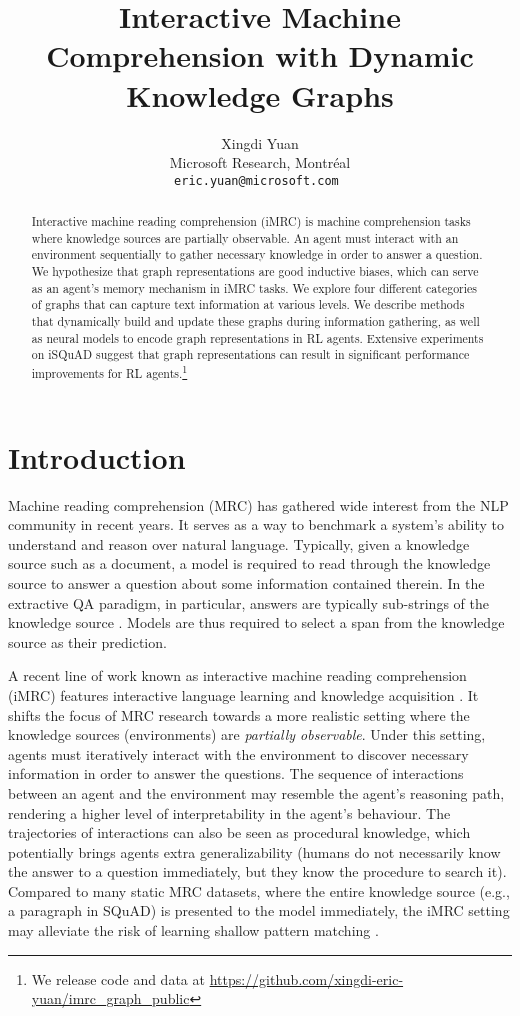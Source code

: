 \documentclass[11pt]{article}
\title{Interactive Machine Comprehension with Dynamic Knowledge Graphs}
\author{Xingdi Yuan\\
Microsoft Research, Montr\'{e}al \\
{\tt eric.yuan@microsoft.com }
}
\newcommand{\isquad}{iSQuAD\xspace}
\newcommand{\imrc}{iMRC\xspace}
\newcommand{\squad}{SQuAD\xspace}
\begin{document}
\maketitle
\begin{abstract}
Interactive machine reading comprehension (\imrc) is machine comprehension tasks where knowledge sources are partially observable. 
An agent must interact with an environment sequentially to gather necessary knowledge in order to answer a question.
We hypothesize that graph representations are good inductive biases, which can serve as an agent's memory mechanism in \imrc tasks.
We explore four different categories of graphs that can capture text information at various levels.
We describe methods that dynamically build and update these graphs during information gathering, as well as neural models to encode graph representations in RL agents.
Extensive experiments on \isquad suggest that graph representations can result in significant performance improvements for RL agents.\footnote{We release code and data at \url{https://github.com/xingdi-eric-yuan/imrc_graph_public}}

\end{abstract}

\section{Introduction}
\label{section:intro}

Machine reading comprehension (MRC) has gathered wide interest from the NLP community in recent years.
It serves as a way to benchmark a system's ability to understand and reason over natural language.
Typically, given a knowledge source such as a document, a model is required to read through the knowledge source to answer a question about some information contained therein.
In the extractive QA paradigm, in particular, answers are typically sub-strings of the knowledge source \citep{rajpurkar16squad,trischler16newsqa,yang18hotpot}.
Models are thus required to select a span from the knowledge source as their prediction.

A recent line of work known as interactive machine reading comprehension (\imrc) features interactive language learning and knowledge acquisition \citep{yuan2020imrc,ferguson2020iirc}.
It shifts the focus of MRC research towards a more realistic setting where the knowledge sources (environments) are \emph{partially observable}. 
Under this setting, agents must iteratively interact with the environment to discover necessary information in order to answer the questions.
The sequence of interactions between an agent and the environment may resemble the agent's reasoning path, rendering a higher level of interpretability in the agent's behaviour.
The trajectories of interactions can also be seen as procedural knowledge, which potentially brings agents extra generalizability (humans do not necessarily know the answer to a question immediately, but they know the procedure to search it).
Compared to many static MRC datasets, where the entire knowledge source (e.g., a paragraph in \squad) is presented to the model immediately, the \imrc setting may alleviate the risk of learning shallow pattern matching \citep{sugawara18easier,sen2020what}.
\end{document}
